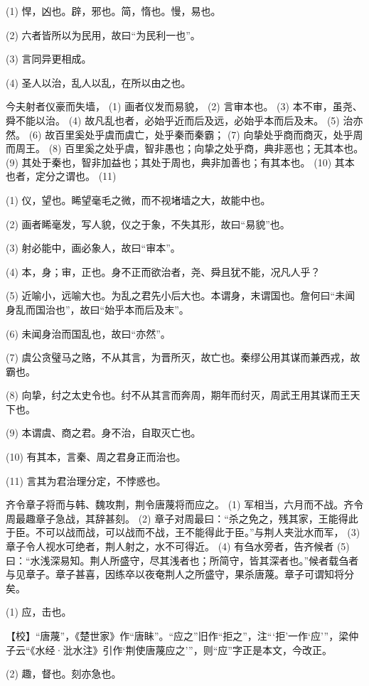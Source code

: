 \documentclass[12pt,UTF8]{ctexbook}
\begin{document}
(1) 悍，凶也。辟，邪也。简，惰也。慢，易也。

(2) 六者皆所以为民用，故曰“为民利一也”。

(3) 言同异更相成。

(4) 圣人以治，乱人以乱，在所以由之也。

今夫射者仪豪而失墙， (1) 画者仪发而易貌， (2) 言审本也。 (3) 本不审，虽尧、舜不能以治。 (4) 故凡乱也者，必始乎近而后及远，必始乎本而后及末。 (5) 治亦然。 (6) 故百里奚处乎虞而虞亡，处乎秦而秦霸； (7) 向挚处乎商而商灭，处乎周而周王。 (8) 百里奚之处乎虞，智非愚也；向挚之处乎商，典非恶也；无其本也。 (9) 其处于秦也，智非加益也；其处于周也，典非加善也；有其本也。 (10) 其本也者，定分之谓也。 (11)

(1) 仪，望也。睎望毫毛之微，而不视堵墙之大，故能中也。

(2) 画者睎毫发，写人貌，仪之于象，不失其形，故曰“易貌”也。

(3) 射必能中，画必象人，故曰“审本”。

(4) 本，身；审，正也。身不正而欲治者，尧、舜且犹不能，况凡人乎？

(5) 近喻小，远喻大也。为乱之君先小后大也。本谓身，末谓国也。詹何曰“未闻身乱而国治也”，故曰“始乎本而后及末”。

(6) 未闻身治而国乱也，故曰“亦然”。

(7) 虞公贪璧马之赂，不从其言，为晋所灭，故亡也。秦缪公用其谋而兼西戎，故霸也。

(8) 向挚，纣之太史令也。纣不从其言而奔周，期年而纣灭，周武王用其谋而王天下也。

(9) 本谓虞、商之君。身不治，自取灭亡也。

(10) 有其本，言秦、周之君身正而治也。

(11) 言其为君治理分定，不悖惑也。

齐令章子将而与韩、魏攻荆，荆令唐蔑将而应之。 (1) 军相当，六月而不战。齐令周最趣章子急战，其辞甚刻。 (2) 章子对周最曰：“杀之免之，残其家，王能得此于臣。不可以战而战，可以战而不战，王不能得此于臣。”与荆人夹沘水而军， (3) 章子令人视水可绝者，荆人射之，水不可得近。 (4) 有刍水旁者，告齐候者 (5) 曰：“水浅深易知。荆人所盛守，尽其浅者也；所简守，皆其深者也。”候者载刍者与见章子。章子甚喜，因练卒以夜奄荆人之所盛守，果杀唐蔑。章子可谓知将分矣。

(1) 应，击也。

【校】“唐蔑”，《楚世家》作“唐眛”。“应之”旧作“拒之”，注“‘拒’一作‘应’”，梁仲子云“《水经·沘水注》引作‘荆使唐蔑应之’”，则“应”字正是本文，今改正。

(2) 趣，督也。刻亦急也。
\end{document}
